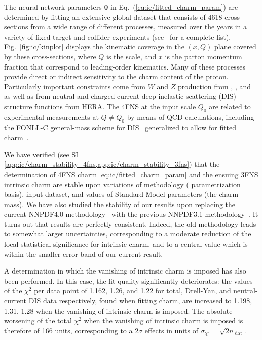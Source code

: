 The neural network parameters ${\boldsymbol \theta}$ in
Eq.~(\ref{eq:ic/fitted_charm_param})
are determined by fitting an extensive global dataset that consists of 4618 
cross-sections from a wide range of different processes, measured over
the years in a variety of fixed-target and collider experiments  (see~\cite{Ball:2021leu} for a complete list).
%
Fig.~\ref{fig:ic/kinplot} displays the kinematic coverage in the $(x,Q)$ plane
covered by these cross-sections, where $Q$ is
the  scale, and  $x$ is
the parton momentum fraction that correspond to leading-order kinematics.
%
Many of these processes provide direct or indirect sensitivity 
to the charm content of the proton.
%
Particularly important constraints come from $W$ and $Z$ production from 
\atlas, \cms, and \lhcb as well as from
neutral and charged current deep-inelastic 
scattering (DIS) structure functions from HERA.
%
The 4FNS  \pdfs at the input scale $Q_0$ are related
to experimental measurements at $Q \not =Q_0$ by means of \nnlo QCD calculations, including
the FONLL-C general-mass scheme for DIS~\cite{Forte:2010ta} generalized to 
allow for fitted charm~\cite{Ball:2015tna}.

We have verified (see SI
\cref{app:ic/charm_stability_4fns,app:ic/charm_stability_3fns}) that the
determination of 4FNS charm \pdf \cref{eq:ic/fitted_charm_param} and the ensuing
3FNS intrinsic charm \pdf are  stable upon variations of methodology (\pdf
parametrization basis), input dataset, and values of Standard Model parameters
(the charm mass).
We have also studied the stability of our results upon replacing the
current NNPDF4.0 methodology~\cite{Ball:2021leu} with the previous
NNPDF3.1 methodology~\cite{NNPDF:2017mvq}. It turns out that results
are  perfectly consistent. Indeed, the old methodology leads to somewhat larger
uncertainties, corresponding to a moderate reduction of the local statistical
significance for intrinsic charm, and to a central value which is
within the smaller  error band of our current result.


A determination in which the vanishing of intrinsic charm is
imposed has also been performed.
%
In this case, the fit quality significantly
deteriorates: the values of the $\chi^2$ per data point of 1.162,
1.26, and 1.22 for total, Drell-Yan, 
and neutral-current DIS data respectively, found when fitting charm, are 
increased to 1.198, 1.31, 1.28 when the vanishing of intrinsic charm
is imposed.
%
The absolute worsening of the total $\chi^2$ when the vanishing of intrinsic charm is imposed is therefore
of 166 units, corresponding to
a $2\sigma$ effects in units of $\sigma_{\chi^2}= \sqrt{2n_\textrm{ dat}}$.

